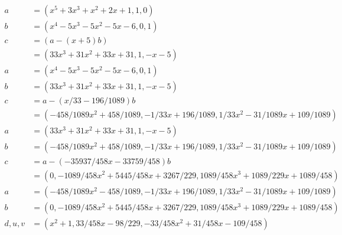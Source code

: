 \documentclass{article}
\begin{document}
\section{}
\begin{equation}
\begin{aligned}
a &= (x^5 + 3x^3 + x^2 + 2x + 1, 1, 0) \\
b &= (x^4 - 5x^3 - 5x^2 - 5x - 6, 0, 1) \\
c &= (a-(x+5)b) \\
  &= (33x^3+31x^2+33x+31, 1, -x-5) \\
a &= (x^4 - 5x^3 - 5x^2 - 5x - 6, 0, 1) \\
b &= (33x^3+31x^2+33x+31, 1, -x-5) \\
c &= a-(x/33 - 196/1089)b \\
  &= (-458/1089x^2 + 458/1089, -1/33x + 196/1089, 1/33x^2 - 31/1089x + 109/1089) \\
a &= (33x^3+31x^2+33x+31, 1, -x-5) \\
b &= (-458/1089x^2 + 458/1089, -1/33x + 196/1089, 1/33x^2 - 31/1089x + 109/1089) \\
c &= a-(-35937/458x - 33759/458)b \\
  &= (0, -1089/458x^2 + 5445/458x + 3267/229, 1089/458x^3 + 1089/229x + 1089/458)\\
a &= (-458/1089x^2 - 458/1089, -1/33x + 196/1089, 1/33x^2 - 31/1089x + 109/1089) \\
b &= (0, -1089/458x^2 + 5445/458x + 3267/229, 1089/458x^3 + 1089/229x + 1089/458) \\
d,u,v &= (x^2 +1, 33/458x - 98/229, -33/458x^2 + 31/458x - 109/458)
\end{aligned}
\end{equation}
\end{document}
